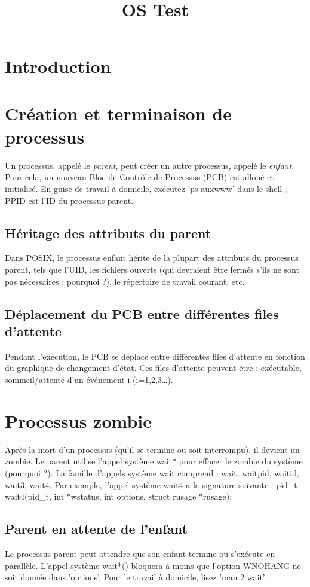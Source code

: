\documentclass[12pt]{report}
\title{OS Test}
\author{}
\begin{document}
\maketitle
\tableofcontents
\newpage

\section{Introduction}
  \section{Création et terminaison de processus}  Un processus, appelé le \textit{parent}, peut créer un autre processus, appelé le \textit{enfant}. Pour cela, un nouveau Bloc de Contrôle de Processus (PCB) est alloué et initialisé. En guise de travail à domicile, exécutez 'ps auxwww' dans le shell ; PPID est l'ID du processus parent.    \subsection{Héritage des attributs du parent}  Dans POSIX, le processus enfant hérite de la plupart des attributs du processus parent, tels que l'UID, les fichiers ouverts (qui devraient être fermés s'ils ne sont pas nécessaires ; pourquoi ?), le répertoire de travail courant, etc.    \subsection{Déplacement du PCB entre différentes files d'attente}  Pendant l'exécution, le PCB se déplace entre différentes files d'attente en fonction du graphique de changement d'état. Ces files d'attente peuvent être : exécutable, sommeil/attente d'un événement i (i=1,2,3…).    \section{Processus zombie}  Après la mort d'un processus (qu'il se termine ou soit interrompu), il devient un zombie. Le parent utilise l'appel système wait* pour effacer le zombie du système (pourquoi ?). La famille d'appels système wait comprend : wait, waitpid, waitid, wait3, wait4. Par exemple, l'appel système wait4 a la signature suivante : pid_t wait4(pid_t, int *wstatus, int options, struct rusage *rusage);    \subsection{Parent en attente de l'enfant}  Le processus parent peut attendre que son enfant termine ou s'exécute en parallèle. L'appel système wait*() bloquera à moins que l'option WNOHANG ne soit donnée dans 'options'. Pour le travail à domicile, lisez 'man 2 wait'.  
\end{document}
